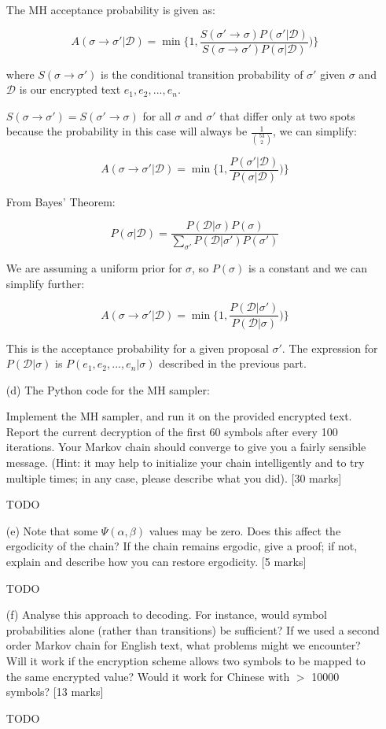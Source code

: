 \documentclass[12pt]{article}
\begin{document}
\begin{enumerate}
The MH acceptance probability is given as:

$$A(\sigma \rightarrow \sigma'| \mathcal{D}) = \min \{1, \frac{S(\sigma' \rightarrow \sigma)P(\sigma'|\mathcal{D})}{S(\sigma \rightarrow \sigma')P(\sigma|\mathcal{D})})\}$$

where $S(\sigma \rightarrow \sigma')$ is the conditional transition probability of $\sigma'$ given $\sigma$ and $\mathcal{D}$ is our encrypted text $e_1, e_2,...,e_n$.

$S(\sigma \rightarrow \sigma') = S(\sigma' \rightarrow \sigma)$ for all $\sigma$ and $\sigma'$ that differ only at two spots because the probability in this case will always be $\frac{1}{{53 \choose 2}}$, we can simplify:

$$A(\sigma \rightarrow \sigma'| \mathcal{D}) = \min \{1, \frac{P(\sigma'|\mathcal{D})}{P(\sigma|\mathcal{D})})\}$$

From Bayes' Theorem:

$$P(\sigma|\mathcal{D}) = \frac{P(\mathcal{D}|\sigma)P(\sigma)}{\sum_{\sigma'}P(\mathcal{D}|\sigma')P(\sigma')}$$

We are assuming a uniform prior for $\sigma$, so $P(\sigma)$ is a constant and we can simplify further:

$$A(\sigma \rightarrow \sigma'| \mathcal{D}) = \min \{1, \frac{P(\mathcal{D}|\sigma')}{P(\mathcal{D}|\sigma)})\}$$

This is the acceptance probability for a given proposal $\sigma'$.
The expression for $P(\mathcal{D}|\sigma)$ is $P(e_1, e_2,...,e_n|\sigma)$ described in the previous part.

\newpage
\item[(d)] The Python code for the MH sampler:

\newpage
Implement the MH sampler, and run it on the provided encrypted text. Report the current decryption of the first 60 symbols after every 100 iterations. Your Markov chain should converge to give you a fairly sensible message. (Hint: it may help to initialize your chain intelligently and to try multiple times; in any case, please describe what you did). [30 marks]

TODO

\item[(e)] Note that some $\Psi(\alpha, \beta)$ values may be zero. Does this affect the ergodicity of the chain? If the chain remains ergodic, give a proof; if not, explain and describe how you can restore ergodicity. [5 marks]

TODO

\item[(f)] Analyse this approach to decoding. For instance, would symbol probabilities alone (rather than transitions) be sufficient? If we used a second order Markov chain for English text, what problems might we encounter? Will it work if the encryption scheme allows two symbols to be mapped to the same encrypted value? Would it work for Chinese with $>$ 10000 symbols? [13 marks]

TODO

\end{enumerate}
\newpage
\end{document}
